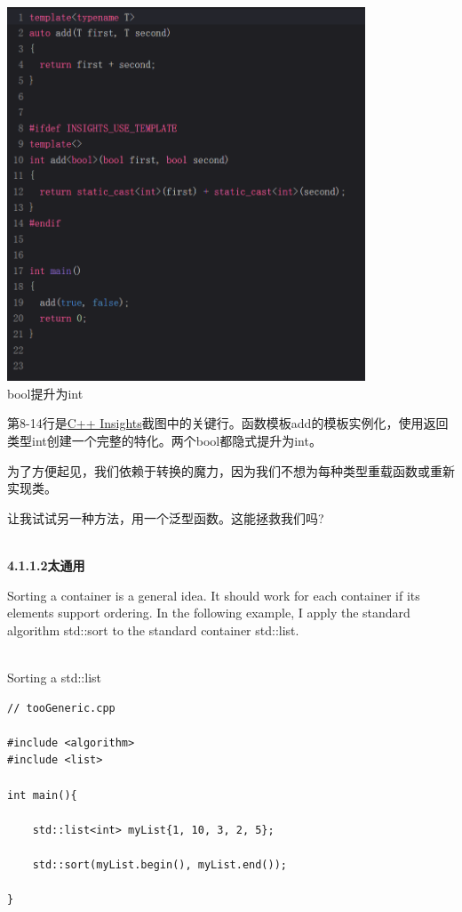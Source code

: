 \begin{center}
\includegraphics[width=0.8\textwidth]{content/3/chapter4/images/1-1.png}\\
bool提升为int
\end{center}

第8-14行是\href{https://cppinsights.io/}{C++ Insights}截图中的关键行。函数模板add的模板实例化，使用返回类型int创建一个完整的特化。两个bool都隐式提升为int。

为了方便起见，我们依赖于转换的魔力，因为我们不想为每种类型重载函数或重新实现类。

让我试试另一种方法，用一个泛型函数。这能拯救我们吗?

\hspace*{\fill} \\ %
\noindent
\textbf{4.1.1.2\hspace{0.2cm}太通用}

Sorting a container is a general idea. It should work for each container if its elements support ordering. In the following example, I apply the standard algorithm std::sort to the standard container std::list.

\hspace*{\fill} \\ %
\noindent
Sorting a std::list
\begin{lstlisting}[style=styleCXX]
// tooGeneric.cpp

#include <algorithm>
#include <list>

int main(){
	
	std::list<int> myList{1, 10, 3, 2, 5};
	
	std::sort(myList.begin(), myList.end());
	
}
\end{lstlisting}

